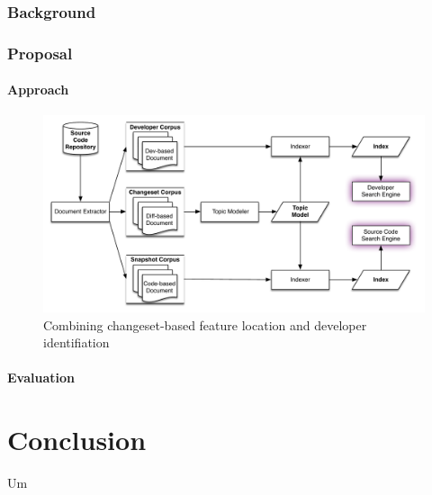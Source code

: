 \documentclass[12pt,draft]{Manuscript}
\begin{document}
\begin{body}
\subsection{Background}\label{background}

\subsection{Proposal}\label{proposal-2}

\subsubsection{Approach}\label{approach-2}

\begin{figure}[htbp]
\centering
\includegraphics{figures/changeset-combo.pdf}
\caption{Combining changeset-based feature location and developer
identifiation \label{fig:changeset-combo}}
\end{figure}

\subsubsection{Evaluation}\label{evaluation-2}

\chapter{Conclusion}\label{conclusion}

Um
\end{body}

\renewcommand\bibname{References}



    \appendix
    
\end{document}
